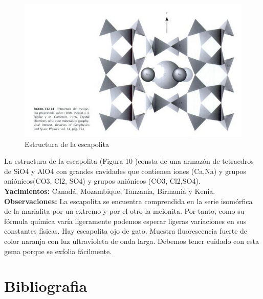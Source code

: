 \documentclass[12pt,a4paper]{article}
\begin{document}
 \begin{figure}[H]
    \centering
	\includegraphics[scale= 0.7]{g.png}
	\caption{Estructura de la escapolita}
\end{figure}



La estructura de la escapolita (Figura 10 )consta de una armazón de tetraedros de  SiO4 y AlO4 con grandes cavidades que contienen iones  (Ca,Na) y grupos aniónicos(CO3, Cl2, SO4) y grupos aniónicos (CO3, Cl2,SO4).\\
\textbf{Yacimientos:}	Canadá, Mozambique, Tanzania, Birmania y Kenia.\\
\textbf{Observaciones:}	La escapolita se encuentra comprendida en la serie isomórfica de la marialita por un extremo y por el otro la meionita. Por tanto, como su fórmula química varía ligeramente podemos esperar ligeras variaciones en sus constantes físicas. Hay escapolita ojo de gato. Muestra fluorescencia fuerte de color naranja con luz ultravioleta de onda larga. Debemos tener cuidado con esta gema porque se exfolia fácilmente.


\newpage

\section*{Bibliografia}
\end{document}
